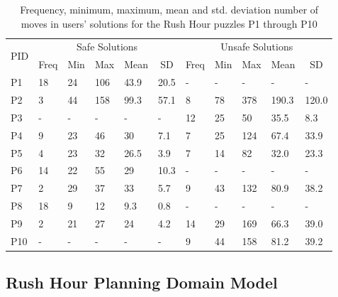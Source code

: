 \begin{table}[htb]
\begin{tabular}{|l|l|l|l|l|l|l|l|l|l|l|}
\hline
\multicolumn{1}{|c|}{\multirow{2}{*}{PID}} &
  \multicolumn{5}{c|}{Safe Solutions} &
  \multicolumn{5}{c|}{Unsafe Solutions} \\ \cline{2-11} 
\multicolumn{1}{|c|}{} &
  \multicolumn{1}{c|}{Freq} &
  \multicolumn{1}{c|}{Min} &
  \multicolumn{1}{c|}{Max} &
  \multicolumn{1}{c|}{Mean} &
  \multicolumn{1}{c|}{SD} &
  \multicolumn{1}{c|}{Freq} &
  \multicolumn{1}{c|}{Min} &
  \multicolumn{1}{c|}{Max} &
  \multicolumn{1}{c|}{Mean} &
  \multicolumn{1}{c|}{SD} \\ \hline
P1  & 18 & 24 & 106 & 43.9  & 20.5  & -  & -  & -   & -    & -    \\ 
P2  &  3  & 44 & 158 & 99.3 & 57.1 & 8  & 78 & 378 & 190.3 & 120.0\\ 
P3  & -  & -  & -   & -     & -     & 12 & 25 & 50  & 35.5 & 8.3  \\ 
P4  & 9  & 23 & 46  & 30    & 7.1   & 7  & 25 & 124 & 67.4 & 33.9 \\ 
P5  & 4  & 23 & 32  & 26.5  & 3.9   & 7  & 14 & 82  & 32.0 & 23.3 \\
P6  & 14 & 22 & 55  & 29    & 10.3  & -  & -  & -   & -    & -    \\
P7  & 2  & 29 & 37  & 33    & 5.7   & 9  & 43 & 132 & 80.9 & 38.2 \\ 
P8  & 18 & 9  & 12  & 9.3   & 0.8   & -  & -  & -   & -    & -    \\
P9  & 2  & 21 & 27  & 24    & 4.2   & 14 & 29 & 169 & 66.3 & 39.0 \\
P10 & -  & -  & -   & -     & -     & 9  & 44 & 158 & 81.2 & 39.2 \\ \hline
\end{tabular}
\caption{Frequency, minimum, maximum, mean and std. deviation number of moves in users' solutions for the Rush Hour puzzles P1 through P10}
\label{tab:usersolutions}
\end{table}



\subsection*{Rush Hour Planning Domain Model}

